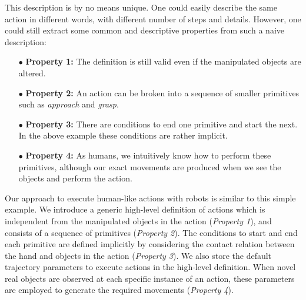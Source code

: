 This description is by no means unique.
One could easily describe the same action in different words, with different number of steps and  details.
However, one could still extract some common and descriptive properties from such a naive description:

\begin{itemize}
  \item[$\bullet$] \textbf{Property 1:} The definition is still valid even if the manipulated objects are altered.
  \item[$\bullet$] \textbf{Property 2:} An action can be broken into a sequence of smaller primitives such as \textit{approach} and \textit{grasp}.
  \item[$\bullet$] \textbf{Property 3:} There are conditions to end one primitive and start the next. In the above example these conditions are rather implicit.
  \item[$\bullet$] \textbf{Property 4:} As humans, we intuitively know how to  perform these primitives, although our exact movements are produced when we see the objects and perform the action.
\end{itemize}


Our approach to execute human-like actions with robots is similar to this simple example.
We introduce a generic high-level definition of actions which is independent from the manipulated objects in the action ({\it Property 1}),
and consists of a sequence of primitives ({\it Property 2}).
The conditions to start and end each primitive are defined %
implicitly by considering the contact relation between the hand and  objects in the action ({\it Property 3}).
We also store the default trajectory parameters to execute actions in the high-level definition.
When novel real objects are observed at each specific instance of an action, these parameters are employed to generate the required movements ({\it Property 4}).

